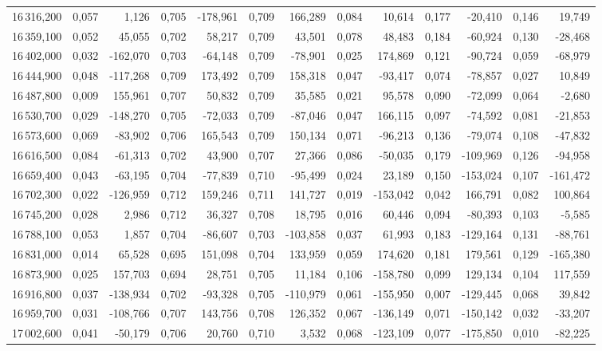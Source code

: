 \begin{longtable}{rrrrrrrrrrrrr}
16\,316,200 & 0,057 & 1,126 & 0,705 & -178,961 & 0,709 & 166,289 & 0,084 & 10,614 & 0,177 & -20,410 & 0,146 & 19,749\\
16\,359,100 & 0,052 & 45,055 & 0,702 & 58,217 & 0,709 & 43,501 & 0,078 & 48,483 & 0,184 & -60,924 & 0,130 & -28,468\\
16\,402,000 & 0,032 & -162,070 & 0,703 & -64,148 & 0,709 & -78,901 & 0,025 & 174,869 & 0,121 & -90,724 & 0,059 & -68,979\\
16\,444,900 & 0,048 & -117,268 & 0,709 & 173,492 & 0,709 & 158,318 & 0,047 & -93,417 & 0,074 & -78,857 & 0,027 & 10,849\\
16\,487,800 & 0,009 & 155,961 & 0,707 & 50,832 & 0,709 & 35,585 & 0,021 & 95,578 & 0,090 & -72,099 & 0,064 & -2,680\\
16\,530,700 & 0,029 & -148,270 & 0,705 & -72,033 & 0,709 & -87,046 & 0,047 & 166,115 & 0,097 & -74,592 & 0,081 & -21,853\\
16\,573,600 & 0,069 & -83,902 & 0,706 & 165,543 & 0,709 & 150,134 & 0,071 & -96,213 & 0,136 & -79,074 & 0,108 & -47,832\\
16\,616,500 & 0,084 & -61,313 & 0,702 & 43,900 & 0,707 & 27,366 & 0,086 & -50,035 & 0,179 & -109,969 & 0,126 & -94,958\\
16\,659,400 & 0,043 & -63,195 & 0,704 & -77,839 & 0,710 & -95,499 & 0,024 & 23,189 & 0,150 & -153,024 & 0,107 & -161,472\\
16\,702,300 & 0,022 & -126,959 & 0,712 & 159,246 & 0,711 & 141,727 & 0,019 & -153,042 & 0,042 & 166,791 & 0,082 & 100,864\\
16\,745,200 & 0,028 & 2,986 & 0,712 & 36,327 & 0,708 & 18,795 & 0,016 & 60,446 & 0,094 & -80,393 & 0,103 & -5,585\\
16\,788,100 & 0,053 & 1,857 & 0,704 & -86,607 & 0,703 & -103,858 & 0,037 & 61,993 & 0,183 & -129,164 & 0,131 & -88,761\\
16\,831,000 & 0,014 & 65,528 & 0,695 & 151,098 & 0,704 & 133,959 & 0,059 & 174,620 & 0,181 & 179,561 & 0,129 & -165,380\\
16\,873,900 & 0,025 & 157,703 & 0,694 & 28,751 & 0,705 & 11,184 & 0,106 & -158,780 & 0,099 & 129,134 & 0,104 & 117,559\\
16\,916,800 & 0,037 & -138,934 & 0,702 & -93,328 & 0,705 & -110,979 & 0,061 & -155,950 & 0,007 & -129,445 & 0,068 & 39,842\\
16\,959,700 & 0,031 & -108,766 & 0,707 & 143,756 & 0,708 & 126,352 & 0,067 & -136,149 & 0,071 & -150,142 & 0,032 & -33,207\\
17\,002,600 & 0,041 & -50,179 & 0,706 & 20,760 & 0,710 & 3,532 & 0,068 & -123,109 & 0,077 & -175,850 & 0,010 & -82,225\\

\end{longtable}
